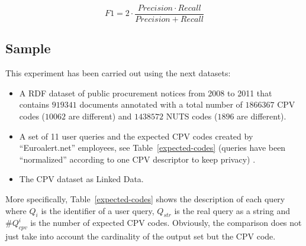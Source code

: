 \begin{equation}\label{eq-3}
F1 = 2 \cdot \frac{Precision \cdot Recall}{ Precision + Recall}
\end{equation}

\subsection{Sample}
This experiment has been carried out using the next datasets:
\begin{itemize}
\item A RDF dataset of public procurement notices from 2008 to 2011 that contains $919341$ documents annotated with 
a total number of $1866367$ CPV codes ($10062$ are different) and $1438572$ NUTS codes ($1896$ are different).
\item A set of 11 user queries and the expected CPV codes created by ``Euroalert.net'' employees, see Table~\ref{expected-codes} 
(queries have been ``normalized'' according to one CPV descriptor to keep privacy) .
\item The CPV dataset as Linked Data.
\end{itemize}

More specifically, Table~\ref{expected-codes} shows the description of each query where $Q_{i}$ is the identifier 
of a user query, $Q_{str}$ is the real query as a string and $\#Q^{i}_{cpv}$ is the number of expected CPV codes. Obviously, the comparison 
does not just take into account the cardinality of the output set but the CPV code.

